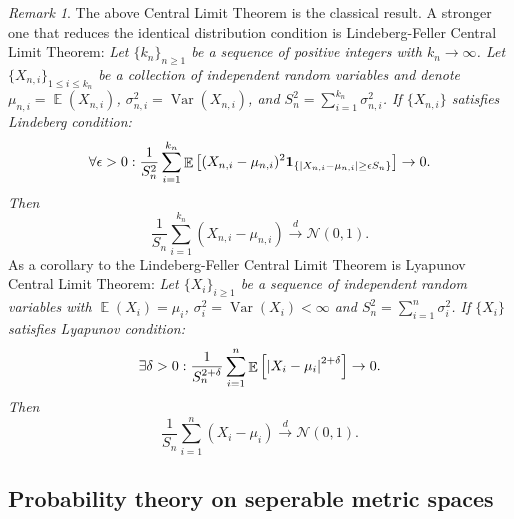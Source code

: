 \documentclass[hidelinks,11pt]{article}
\theoremstyle{definition}
\theoremstyle{dotles}
\theoremstyle{dotless}
\theoremstyle{remark}
\newtheorem*{remark}{Remark}
\DeclareMathOperator{\Var}{Var}
\DeclareMathOperator{\E}{\mathbb{E}}
\begin{document}
\begin{remark}
The above Central Limit Theorem is the classical result. A stronger one that reduces the identical distribution condition is Lindeberg-Feller Central Limit Theorem:\smallbreak
\textit{Let $\{k_n\}_{n\geq1}$ be a sequence of positive integers with $k_n\to\infty$. Let $\{X_{n,i}\}_{1\leq i\leq k_n}$ be a collection of independent random variables and denote $\mu_{n,i}=\E(X_{n,i})$, $\sigma_{n,i}^2=\Var(X_{n,i})$, and $S_n^2=\sum_{i=1}^{k_n}\sigma_{n,i}^2$. If $\{X_{n,i}\}$ satisfies Lindeberg condition:}
\[\forall\epsilon>0:\frac{1}{S_n^2}\sum_{i=1}^{k_n}\E\left[(X_{n,i}-\mu_{n,i})^2\textbf{1}_{\{\abs{X_{n,i}-\mu_{n,i}}\geq\epsilon S_n\}}\right]\to0.\]
\textit{Then}
\[\frac{1}{S_n}\sum_{i=1}^{k_n}(X_{n,i}-\mu_{n,i})\xrightarrow{d}\mathcal{N}(0,1).\]
As a corollary to the Lindeberg-Feller Central Limit Theorem is Lyapunov Central Limit Theorem:\smallbreak
\textit{Let $\{X_i\}_{i\geq1}$ be a sequence of independent random variables with $\E(X_i)=\mu_i$, $\sigma_i^2=\Var(X_i)<\infty$ and $S_n^2=\sum_{i=1}^n\sigma_i^2$. If $\{X_i\}$ satisfies Lyapunov condition:}
\[\exists\delta>0:\frac{1}{S_n^{2+\delta}}\sum_{i=1}^n\E\left[\abs{X_i-\mu_i}^{2+\delta}\right]\to0.\]
\textit{Then}
\[\frac{1}{S_n}\sum_{i=1}^n(X_i-\mu_i)\xrightarrow{d}\mathcal{N}(0,1).\]
\end{remark}

\bigbreak
\subsection{Probability theory on seperable metric spaces}
\end{document}
